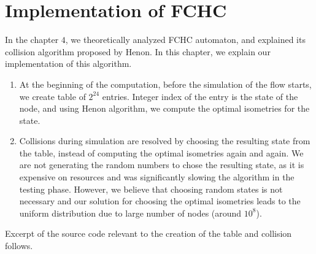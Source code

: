 \chapter{Implementation of FCHC}

In the chapter $4$, we theoretically analyzed FCHC automaton, and explained its collision algorithm proposed by Henon. In this chapter, we explain our implementation of this algorithm.

%



\begin{enumerate}
\item At the beginning of the computation, before the simulation of the flow starts, we create table of $2^{24}$ entries. Integer index of the entry is the state of the node, and using Henon algorithm, we compute the optimal isometries for the state.
\item Collisions during simulation are resolved by choosing the resulting state from the table, instead of computing the optimal isometries again and again. We are not generating the random numbers to chose the resulting state, as it is expensive on resources and was significantly slowing the algorithm in the testing phase. However, we believe that choosing random states is not necessary and our solution for choosing the optimal isometries leads to the uniform distribution due to large number of nodes (around $10^{8}$).

\end{enumerate}

Excerpt of the source code relevant to the creation of the table and collision follows.

